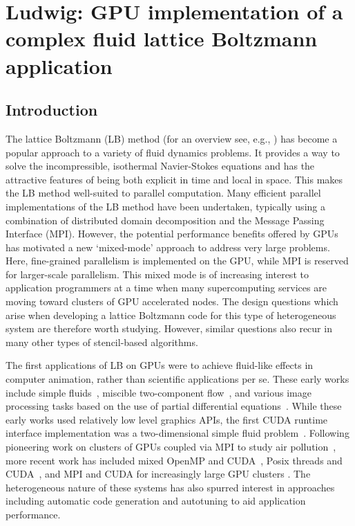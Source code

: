 
\chapter{Ludwig: GPU implementation of a complex fluid lattice Boltzmann
application}



\section{Introduction}
The lattice Boltzmann (LB) method (for an overview see, e.g.,
\cite{succi-book}) has become a popular approach to a variety of fluid
dynamics problems.  It provides a way to solve the incompressible,
isothermal Navier-Stokes equations and has the attractive features of
being both explicit in time and local in space. This makes the LB
method well-suited to parallel computation. Many efficient parallel
implementations of the LB method have been undertaken, typically using
a combination of distributed domain decomposition and the Message
Passing Interface (MPI). However, the potential
performance benefits offered by GPUs has motivated a new `mixed-mode'
approach to address very large problems. Here, fine-grained
parallelism is implemented on the GPU, while MPI is reserved for
larger-scale parallelism.  This mixed mode is of increasing interest
to application programmers at a time when many supercomputing services
are moving
toward clusters of GPU accelerated nodes. The design questions which
arise when developing a lattice Boltzmann code for this type of
heterogeneous system are therefore worth studying. However, similar
questions also recur in many other types of stencil-based algorithms.

The first applications of LB on GPUs were to achieve fluid-like
effects in computer animation, rather than scientific applications per
se.  These early works include simple fluids~\cite{wei2004}, miscible
two-component flow~\cite{zhu2006}, and various image processing tasks
based on the use of partial differential equations~\cite{zhao2007}.
While these early works used relatively low level graphics APIs, the
first CUDA runtime interface implementation was a two-dimensional
simple fluid problem~\cite{toelke2010}.  Following pioneering work on
clusters of GPUs coupled via MPI to study air
pollution~\cite{fan2004}, more recent work has included mixed OpenMP
and CUDA~\cite{myre2011}, Posix threads and CUDA~\cite{obrecht2011},
and MPI and CUDA for increasingly large GPU clusters
\cite{bernaschi2010,xian2011,feichtinger2011}. The heterogeneous
nature of these systems has also spurred interest in approaches
including automatic code generation \cite{walshsaar2012} and autotuning
\cite{williams2011} to aid application performance.

